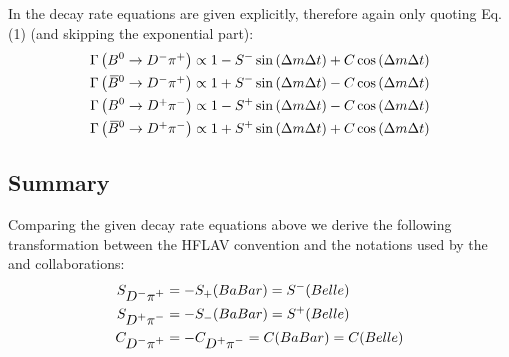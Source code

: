 \subsection{\belle}

In \cite{Ronga:2006hv} the decay rate equations are given explicitly, therefore again only quoting Eq. (1) (and skipping
the exponential part):
\begin{align}
\Gamma\left(B^0\rightarrow \mbox{\ensuremath{D^{-}\pi^{+}}}\right) \propto 1-S^{-}\sin\left(\Delta m \Delta t\right)+C\cos\left(\Delta m \Delta t\right) \\
\Gamma\left(\kern 0.18em\overline{\kern -0.18em B}{}^0\rightarrow \mbox{\ensuremath{D^{-}\pi^{+}}}\right) \propto 1+S^{-}\sin\left(\Delta m \Delta t\right)-C\cos\left(\Delta m \Delta t\right) \\
\Gamma\left(B^0\rightarrow \mbox{\ensuremath{D^{+}\pi^{-}}}\right) \propto 1-S^{+}\sin\left(\Delta m \Delta t\right)-C\cos\left(\Delta m \Delta t\right) \\
\Gamma\left(\kern 0.18em\overline{\kern -0.18em B}{}^0\rightarrow \mbox{\ensuremath{D^{+}\pi^{-}}}\right) \propto 1+S^{+}\sin\left(\Delta m \Delta t\right)+C\cos\left(\Delta m \Delta t\right)
\end{align}

\subsection{Summary}

Comparing the given decay rate equations above we derive the following transformation between the HFLAV convention and the
notations used by the \babar and \belle collaborations:
\begin{align}
S_{\mbox{\ensuremath{D^{-}\pi^{+}}}} &= -S_{+}(BaBar) = S^{-}(Belle)\\
S_{\mbox{\ensuremath{D^{+}\pi^{-}}}} &= -S_{-}(BaBar) = S^{+}(Belle)\\
C_{\mbox{\ensuremath{D^{-}\pi^{+}}}} &= -C_{\mbox{\ensuremath{D^{+}\pi^{-}}}} = C(BaBar) = C(Belle)
\end{align}
